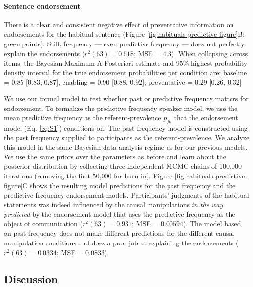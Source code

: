\documentclass[english,floatsintext,man]{apa6}
\theoremstyle{definition}
\theoremstyle{definition}
\theoremstyle{definition}
\theoremstyle{remark}
\begin{document}
\paragraph{Sentence endorsement}\label{sentence-endorsement}

There is a clear and consistent negative effect of preventative
information on endorsements for the habitual sentence (Figure
\ref{fig:habituals-predictive-figure}B; green points). Still, frequency
--- even predictive frequency --- does not perfectly explain the
endorsements (\(r^2(63) = 0.518\); MSE = \(4.3\)). When collapsing
across items, the Bayesian Maximum A-Posteriori estimate and 95\%
highest probability density interval for the true endorsement
probabilities per condition are: baseline = 0.85 {[}0.83, 0.87{]},
enabling = 0.90 {[}0.88, 0.92{]}, preventative = 0.29 {[}0.26, 0.32{]}

We use our formal model to test whether past or predictive frequency
matters for endorsement. To formalize the predictive frequency speaker
model, we use the mean predictive frequency as the referent-prevalence
\(p_{fk}\) that the endorsement model (Eq. \ref{eq:S1}) conditions on.
The past frequency model is constructed using the past frequency
supplied to participants as the referent-prevalence. We analyze this
model in the same Bayesian data analysis regime as for our previous
models. We use the same priors over the parameters as before and learn
about the posterior distribution by collecting three independent MCMC
chains of 100,000 iterations (removing the first 50,000 for burn-in).
Figure \ref{fig:habituals-predictive-figure}C shows the resulting model
predictions for the past frequency and the predictive frequency
endorsement models. Participants' judgments of the habitual statements
was indeed influenced by the causal manipulations \emph{in the way
predicted} by the endorsement model that uses the predictive frequency
as the object of communication (\(r^2(63) = 0.931\); MSE = \(0.00594\)).
The model based on past frequency does not make different predictions
for the different causal manipulation conditions and does a poor job at
explaining the endorsements (\(r^2(63) = 0.0334\); MSE = \(0.0833\)).

\subsection{Discussion}\label{discussion-2}
\end{document}
